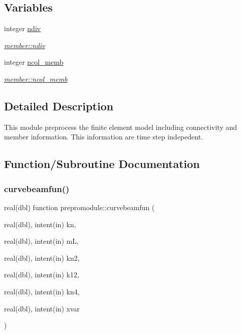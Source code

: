 \subsection*{Variables}
\begin{DoxyCompactItemize}
\item 
integer \hyperlink{namespaceprepromodule_a6339275501f8c1e8f0b418c9e918005e}{ndiv}
\begin{DoxyCompactList}\small\item\em \hyperlink{namespacemember_a3e6a3b0896edb5c30c113dc22ab7181a}{member\+::ndiv} \end{DoxyCompactList}\item 
integer \hyperlink{namespaceprepromodule_a41d66ef3ffc050f01bc1763c62c6f3e1}{ncol\+\_\+memb}
\begin{DoxyCompactList}\small\item\em \hyperlink{namespacemember_a20895477b227a3352a4e758b21b01bf8}{member\+::ncol\+\_\+memb} \end{DoxyCompactList}\end{DoxyCompactItemize}


\subsection{Detailed Description}
This module preprocess the finite element model including connectivity and member information. This information are time step indepedent. 

\subsection{Function/\+Subroutine Documentation}
\mbox{\label{namespaceprepromodule_aba8b0787c8f7aa138ead8a8c9161bc4b}} 
\subsubsection{\texorpdfstring{curvebeamfun()}{curvebeamfun()}}
{\footnotesize\ttfamily real(dbl) function prepromodule\+::curvebeamfun (\begin{DoxyParamCaption}\item[{real(dbl), intent(in)}]{kn,  }\item[{real(dbl), intent(in)}]{mL,  }\item[{real(dbl), intent(in)}]{kn2,  }\item[{real(dbl), intent(in)}]{k12,  }\item[{real(dbl), intent(in)}]{kn4,  }\item[{real(dbl), intent(in)}]{xvar }\end{DoxyParamCaption})\hspace{0.3cm}{\ttfamily [private]}}



